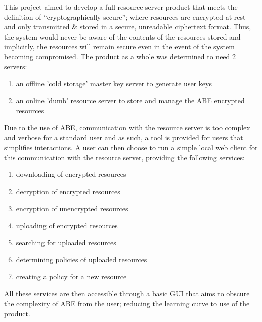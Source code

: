 This project aimed to develop a full resource server product that meets the definition of ``cryptographically secure''; where resources are encrypted at rest and only transmitted \& stored in a secure, unreadable ciphertext format. Thus, the system would never be aware of the contents of the resources stored and implicitly, the resources will remain secure even in the event of the system becoming compromised. The product as a whole was determined to need 2 servers:
\begin{enumerate}
  \item an offline 'cold storage' master key server to generate user keys
  \item an online 'dumb' resource server to store and manage the ABE encrypted resources
\end{enumerate}
Due to the use of ABE, communication with the resource server is too complex and verbose for a standard user and as such, a tool is provided for users that simplifies interactions. A user can then choose to run a simple local web client for this communication with the resource server, providing the following services:
\begin{enumerate}
  \item downloading of encrypted resources
  \item decryption of encrypted resources
  \item encryption of unencrypted resources
  \item uploading of encrypted resources
  \item searching for uploaded resources
  \item determining policies of uploaded resources
  \item creating a policy for a new resource
\end{enumerate}
All these services are then accessible through a basic GUI that aims to obscure the complexity of ABE from the user; reducing the learning curve to use of the product.

